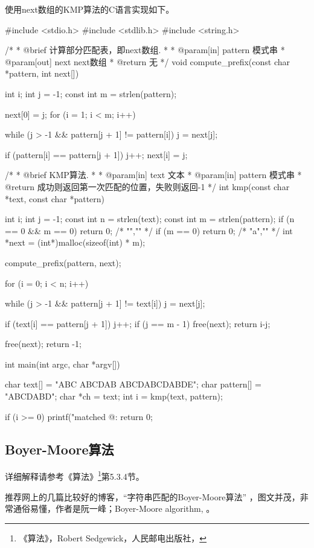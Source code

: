 使用next数组的KMP算法的C语言实现如下。
\begin{Codex}[label=kmp.c]
#include <stdio.h>
#include <stdlib.h>
#include <string.h>

/*
 * @brief 计算部分匹配表，即next数组.
 *
 * @param[in] pattern 模式串
 * @param[out] next next数组
 * @return 无
 */
void compute_prefix(const char *pattern, int next[]) {
    int i;
    int j = -1;
    const int m = strlen(pattern);

    next[0] = j;
    for (i = 1; i < m; i++) {
        while (j > -1 && pattern[j + 1] != pattern[i]) j = next[j];

        if (pattern[i] == pattern[j + 1]) j++;
        next[i] = j;
    }
}

/*
 * @brief KMP算法.
 *
 * @param[in] text 文本
 * @param[in] pattern 模式串
 * @return 成功则返回第一次匹配的位置，失败则返回-1
 */
int kmp(const char *text, const char *pattern) {
    int i;
    int j = -1;
    const int n = strlen(text);
    const int m = strlen(pattern);
    if (n == 0 && m == 0) return 0; /* "","" */
    if (m == 0) return 0;  /* "a","" */
    int *next = (int*)malloc(sizeof(int) * m);

    compute_prefix(pattern, next);

    for (i = 0; i < n; i++) {
        while (j > -1 && pattern[j + 1] != text[i]) j = next[j];

        if (text[i] == pattern[j + 1]) j++;
        if (j == m - 1) {
            free(next);
            return i-j;
        }
    }

    free(next);
    return -1;
}


int main(int argc, char *argv[]) {
    char text[] = "ABC ABCDAB ABCDABCDABDE";
    char pattern[] = "ABCDABD";
    char *ch = text;
    int i = kmp(text, pattern);

    if (i >= 0) printf("matched @: %
    return 0;
}
\end{Codex}


\subsection{Boyer-Moore算法}
详细解释请参考《算法》\footnote{《算法》，Robert Sedgewick，人民邮电出版社，}第5.3.4节。

推荐网上的几篇比较好的博客，“字符串匹配的Boyer-Moore算法” ，图文并茂，非常通俗易懂，作者是阮一峰；Boyer-Moore algorithm, 。

